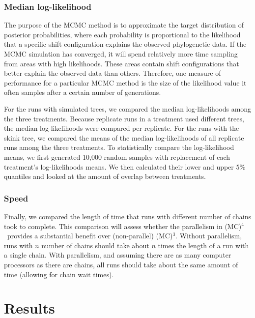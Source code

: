 \documentclass[12pt]{article}
\newcommand{\MCMCMC}{(MC)$^{3}$}
\newcommand{\MCMCMCMC}{(MC)$^{4}$}
\begin{document}
\subsubsection*{Median log-likelihood}

The purpose of the MCMC method is to approximate
the target distribution of posterior probabilities,
where each probability is proportional
to the likelihood that a specific shift configuration
explains the observed phylogenetic data.
%
If the MCMC simulation has converged,
it will spend relatively more time sampling
from areas with high likelihoods.
%
These areas contain shift configurations
that better explain the observed data than others.
%
Therefore, one measure of performance for a particular MCMC method
is the size of the likelihood value it often samples
after a certain number of generations.


For the runs with simulated trees,
we compared the median log-likelihoods
among the three treatments.
%
Because replicate runs in a treatment used different trees,
the median log-likelihoods were compared per replicate.
%
For the runs with the skink tree,
we compared the means of the median log-likelihoods
of all replicate runs among the three treatments.
%
To statistically compare the log-likelihood means,
we first generated 10,000 random samples with replacement
of each treatment's log-likelihoods means.
%
We then calculated their lower and upper 5\% quantiles
and looked at the amount of overlap between treatments.


\subsubsection*{Speed}

Finally, we compared the length of time that runs
with different number of chains took to complete.
%
This comparison will assess whether the parallelism in \MCMCMCMC\ 
provides a substantial benefit over (non-parallel) \MCMCMC.
%
Without parallelism, runs with $n$ number of chains
should take about $n$ times the length of a run with a single chain.
%
With parallelism, and assuming there are as many computer processors
as there are chains, all runs should take about the same amount of time
(allowing for chain wait times).


\section*{Results}
\end{document}
